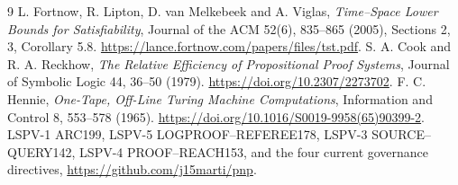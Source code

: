 \documentclass[11pt]{article}
\begin{document}
\begin{thebibliography}{9}
L. Fortnow, R. Lipton, D. van Melkebeek and A. Viglas,
\emph{Time--Space Lower Bounds for Satisfiability},
Journal of the ACM 52(6), 835--865 (2005),
Sections 2, 3, Corollary 5.8.
\url{https://lance.fortnow.com/papers/files/tst.pdf}.
S. A. Cook and R. A. Reckhow,
\emph{The Relative Efficiency of Propositional Proof Systems},
Journal of Symbolic Logic 44, 36--50 (1979).
\url{https://doi.org/10.2307/2273702}.
F. C. Hennie,
\emph{One-Tape, Off-Line Turing Machine Computations},
Information and Control 8, 553--578 (1965).
\url{https://doi.org/10.1016/S0019-9958(65)90399-2}.
LSPV-1 ARC199, LSPV-5 LOGPROOF--REFEREE178,
LSPV-3 SOURCE--QUERY142, LSPV-4 PROOF--REACH153,
and the four current governance directives,
\url{https://github.com/j15marti/pnp}.
\end{thebibliography}
\end{document}
